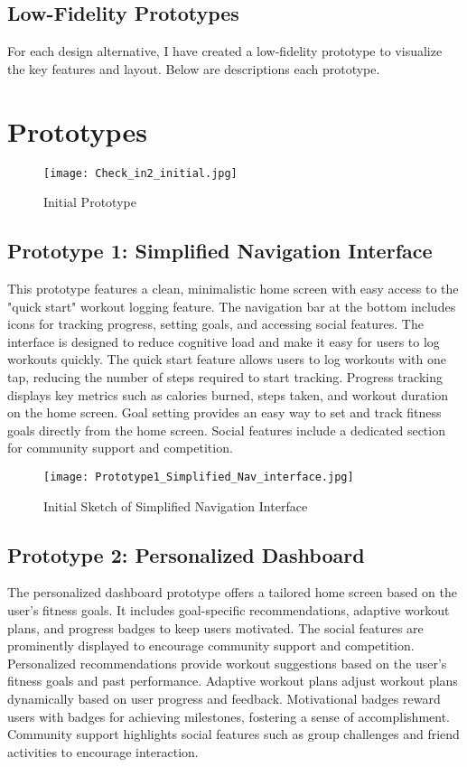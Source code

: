 \documentclass[
	letterpaper, %
]{jdf}
\begin{document}
\subsection {Low-Fidelity Prototypes}
For each design alternative, I have created a low-fidelity prototype to visualize the key features and layout. Below are descriptions each prototype.

\hfill \break
\hfill \break

\section{Prototypes}
\begin{figure}
    \centering
    \texttt{[image: Check\_in2\_initial.jpg]}
    \caption{Initial Prototype}
    \label{fig:enter-label}
\end{figure}

\subsection{Prototype 1: Simplified Navigation Interface}
This prototype features a clean, minimalistic home screen with easy access to the "quick start" workout logging feature. The navigation bar at the bottom includes icons for tracking progress, setting goals, and accessing social features. The interface is designed to reduce cognitive load and make it easy for users to log workouts quickly. The quick start feature allows users to log workouts with one tap, reducing the number of steps required to start tracking. Progress tracking displays key metrics such as calories burned, steps taken, and workout duration on the home screen. Goal setting provides an easy way to set and track fitness goals directly from the home screen. Social features include a dedicated section for community support and competition.

\begin{figure}
    \centering
    \texttt{[image: Prototype1\_Simplified\_Nav\_interface.jpg]}
    \caption{Initial Sketch of Simplified Navigation Interface}
    \label{fig:enter-label}
\end{figure}

\subsection {Prototype 2: Personalized Dashboard}
The personalized dashboard prototype offers a tailored home screen based on the user's fitness goals. It includes goal-specific recommendations, adaptive workout plans, and progress badges to keep users motivated. The social features are prominently displayed to encourage community support and competition. Personalized recommendations provide workout suggestions based on the user's fitness goals and past performance. Adaptive workout plans adjust workout plans dynamically based on user progress and feedback. Motivational badges reward users with badges for achieving milestones, fostering a sense of accomplishment. Community support highlights social features such as group challenges and friend activities to encourage interaction.
\end{document}
